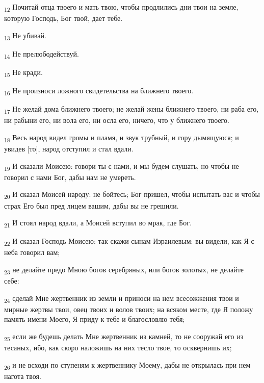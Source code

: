 \begin{tcolorbox}
\textsubscript{12} Почитай отца твоего и мать твою, чтобы продлились дни твои на земле, которую Господь, Бог твой, дает тебе.
\end{tcolorbox}
\begin{tcolorbox}
\textsubscript{13} Не убивай.
\end{tcolorbox}
\begin{tcolorbox}
\textsubscript{14} Не прелюбодействуй.
\end{tcolorbox}
\begin{tcolorbox}
\textsubscript{15} Не кради.
\end{tcolorbox}
\begin{tcolorbox}
\textsubscript{16} Не произноси ложного свидетельства на ближнего твоего.
\end{tcolorbox}
\begin{tcolorbox}
\textsubscript{17} Не желай дома ближнего твоего; не желай жены ближнего твоего, ни раба его, ни рабыни его, ни вола его, ни осла его, ничего, что у ближнего твоего.
\end{tcolorbox}
\begin{tcolorbox}
\textsubscript{18} Весь народ видел громы и пламя, и звук трубный, и гору дымящуюся; и увидев [то], народ отступил и стал вдали.
\end{tcolorbox}
\begin{tcolorbox}
\textsubscript{19} И сказали Моисею: говори ты с нами, и мы будем слушать, но чтобы не говорил с нами Бог, дабы нам не умереть.
\end{tcolorbox}
\begin{tcolorbox}
\textsubscript{20} И сказал Моисей народу: не бойтесь; Бог пришел, чтобы испытать вас и чтобы страх Его был пред лицем вашим, дабы вы не грешили.
\end{tcolorbox}
\begin{tcolorbox}
\textsubscript{21} И стоял народ вдали, а Моисей вступил во мрак, где Бог.
\end{tcolorbox}
\begin{tcolorbox}
\textsubscript{22} И сказал Господь Моисею: так скажи сынам Израилевым: вы видели, как Я с неба говорил вам;
\end{tcolorbox}
\begin{tcolorbox}
\textsubscript{23} не делайте предо Мною богов серебряных, или богов золотых, не делайте себе:
\end{tcolorbox}
\begin{tcolorbox}
\textsubscript{24} сделай Мне жертвенник из земли и приноси на нем всесожжения твои и мирные жертвы твои, овец твоих и волов твоих; на всяком месте, где Я положу память имени Моего, Я приду к тебе и благословлю тебя;
\end{tcolorbox}
\begin{tcolorbox}
\textsubscript{25} если же будешь делать Мне жертвенник из камней, то не сооружай его из тесаных, ибо, как скоро наложишь на них тесло твое, то осквернишь их;
\end{tcolorbox}
\begin{tcolorbox}
\textsubscript{26} и не всходи по ступеням к жертвеннику Моему, дабы не открылась при нем нагота твоя.
\end{tcolorbox}
